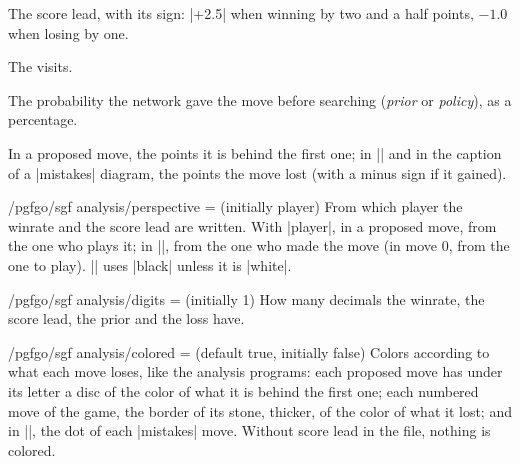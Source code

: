 \begin{command}{\pgfgolead}
	The score lead, with its sign: |+2.5| when winning by two and a half points, $-1.0$ when losing by one.
\end{command}

\begin{command}{\pgfgovisits}
	The visits.
\end{command}

\begin{command}{\pgfgoprior}
	The probability the network gave the move before searching (\emph{prior} or \emph{policy}), as a percentage.
\end{command}

\begin{command}{\pgfgoloss}
	In a proposed move, the points it is behind the first one; in |\sgfinfo| and in the caption of a |mistakes| diagram, the points the move lost (with a minus sign if it gained).
\end{command}

\begin{key}{/pgfgo/sgf analysis/perspective =  (initially player)}
	From which player the winrate and the score lead are written. With |player|, in a proposed move, from the one who plays it; in |\sgfinfo|, from the one who made the move (in move 0, from the one to play). |\sgfgraph| uses |black| unless it is |white|.
\end{key}

\begin{key}{/pgfgo/sgf analysis/digits =  (initially 1)}
	How many decimals the winrate, the score lead, the prior and the loss have.

	\begin{codeexample}[]
		\begin{goban}[9, scale = 0.6]
		\end{goban}
		\pgfgocandidates[perspective = black, digits = 2]
	\end{codeexample}
\end{key}

\begin{key}{/pgfgo/sgf analysis/colored =  (default true, initially false)}
	Colors according to what each move loses, like the analysis programs: each proposed move has under its letter a disc of the color of what it is behind the first one; each numbered move of the game, the border of its stone, thicker, of the color of what it lost; and in |\sgfgraph|, the dot of each |mistakes| move. Without score lead in the file, nothing is colored.

	\begin{codeexample}[]
		\begin{goban}[9, scale = 0.6]
		\end{goban}
	\end{codeexample}
\end{key}

